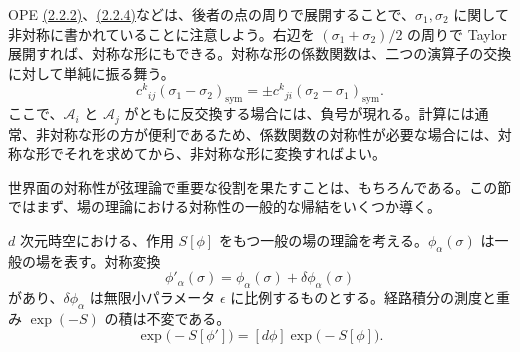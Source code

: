OPE \hyperref[eq:2.2.2]{(2.2.2)}、\hyperref[eq:2.2.4]{(2.2.4)}などは、後者の点の周りで展開することで、$\sigma_1,\sigma_2$ に関して非対称に書かれていることに注意しよう。右辺を $(\sigma_1+\sigma_2)/2$ の周りで Taylor 展開すれば、対称な形にもできる。対称な形の係数関数は、二つの演算子の交換に対して単純に振る舞う。
\begin{equation}
c^k{}_{ij}(\sigma_1-\sigma_2)_{\mathrm{sym}}
=\pm c^k{}_{ji}(\sigma_2-\sigma_1)_{\mathrm{sym}}.
\tag{2.2.15}\label{eq:2.2.15}
\end{equation}
ここで、$\mathcal A_i$ と $\mathcal A_j$ がともに反交換する場合には、負号が現れる。計算には通常、非対称な形の方が便利であるため、係数関数の対称性が必要な場合には、対称な形でそれを求めてから、非対称な形に変換すればよい。

\label{sec:2.3}

世界面の対称性が弦理論で重要な役割を果たすことは、もちろんである。この節ではまず、場の理論における対称性の一般的な帰結をいくつか導く。

$d$ 次元時空における、作用 $S[\phi]$ をもつ一般の場の理論を考える。$\phi_\alpha(\sigma)$ は一般の場を表す。対称変換
\begin{equation}
\phi'_\alpha(\sigma)=\phi_\alpha(\sigma)+\delta\phi_\alpha(\sigma)
\tag{2.3.1}\label{eq:2.3.1}
\end{equation}
があり、$\delta\phi_\alpha$ は無限小パラメータ $\epsilon$ に比例するものとする。経路積分の測度と重み $\exp(-S)$ の積は不変である。
\begin{equation}
[d\phi']\exp\bigl(-S[\phi']\bigr)
=[d\phi]\exp\bigl(-S[\phi]\bigr).
\tag{2.3.2}\label{eq:2.3.2}
\end{equation}

